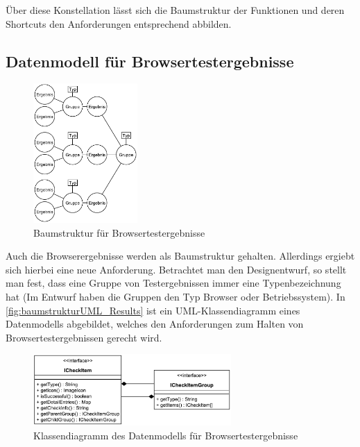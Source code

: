 Über diese Konstellation lässt sich die Baumstruktur der Funktionen und deren Shortcuts den Anforderungen entsprechend abbilden.

\newpage

\subsection{Datenmodell für Browsertestergebnisse}

\begin{figure}
	\includegraphics[width=150px]{../graphic/diagrams/Baumstruktur_Results/Baumstruktur}
	\caption{Baumstruktur für Browsertestergebnisse}
	\label{fig:baumstruktur_Result}
\end{figure}

Auch die Browserergebnisse werden als Baumstruktur gehalten. Allerdings ergiebt sich hierbei eine neue Anforderung. Betrachtet man den Designentwurf, so stellt man fest, dass eine Gruppe von Testergebnissen immer eine Typenbezeichnung hat (Im Entwurf haben die Gruppen den Typ \glqq Browser\grqq\xspace oder \glqq Betriebssystem\grqq). In \autoref{fig:baumstrukturUML_Results} ist ein UML-Klassendiagramm eines Datenmodells abgebildet, welches den Anforderungen zum Halten von Browsertestergebnissen gerecht wird.

\begin{figure}[H]
	\flushright
	\includegraphics[width=285px]{../graphic/diagrams/CD_Baumstruktur_Results/Baumstruktur}
	\captionsetup{width=235px, justification=raggedleft}
	\caption{Klassendiagramm des Datenmodells für Browsertestergebnisse}
	\label{fig:baumstrukturUML_Results}
\end{figure}

